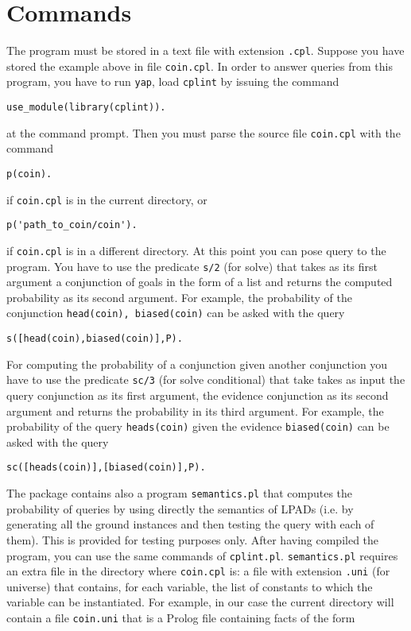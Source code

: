 \documentclass[a4paper,12pt]{article}
\begin{document}
\section{Commands}
The program must be stored in a text file with extension \texttt{.cpl}. Suppose you have stored the example above in file \texttt{coin.cpl}. 
In order to answer queries from this program, you have to run \texttt{yap},
load \texttt{cplint} by issuing the command
\begin{verbatim}
use_module(library(cplint)).
\end{verbatim}
at the command prompt.
Then you must parse the source file \texttt{coin.cpl}  with the command
\begin{verbatim}
p(coin).
\end{verbatim}
if \texttt{coin.cpl} is in the current directory, or 
\begin{verbatim}
p('path_to_coin/coin').
\end{verbatim}
if \texttt{coin.cpl} is in a different directory.
At this point you can pose query to the program. You have to use the predicate \texttt{s/2} (for solve) that takes as its first argument a conjunction of goals in the form of a list and returns the computed probability as its second argument. For example, the probability of the conjunction \texttt{head(coin), biased(coin)} can be asked with the query
\begin{verbatim}
s([head(coin),biased(coin)],P).
\end{verbatim}
For computing the probability of a conjunction given another conjunction you have to use the predicate \texttt{sc/3} (for solve conditional) that take takes as input the query conjunction as its first argument, the evidence conjunction as its second argument and returns the probability in its third argument.
For example, the probability of  the query \texttt{heads(coin)} given the evidence \texttt{biased(coin)} can be asked with the query
\begin{verbatim}
sc([heads(coin)],[biased(coin)],P).
\end{verbatim}
The package contains also a program \texttt{semantics.pl} that computes the probability of queries by using directly the semantics of LPADs (i.e. by generating all the ground instances and then testing the query with each of them). This is provided for testing purposes only.  After having compiled the program, you can use the same commands of \texttt{cplint.pl}. \texttt{semantics.pl} requires an extra file in the directory where \texttt{coin.cpl} is: a file with extension \texttt{.uni} (for universe) that contains, for each variable, the list of constants to which the variable can be instantiated. For example, in our case the current directory will contain a file \texttt{coin.uni} that is a Prolog file containing facts of the form
\end{document}
